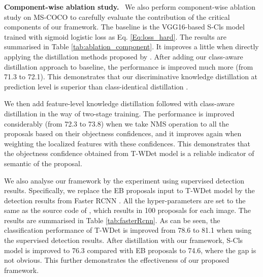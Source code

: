 \documentclass[sigconf,natbib=false]{acmart}
\begin{document}
\noindent \textbf{Component-wise ablation study.} \ We also perform component-wise ablation study on MS-COCO to carefully evaluate the contribution of the critical components of our framework. The baseline is the VGG16-based S-Cls model trained with sigmoid logistic loss as Eq. \ref{Eq:loss_hard}. The results are summarised in Table \ref{tab:ablation_component}. It improves a little when directly applying the distillation methods proposed by \cite{KD1_nips15_goj}. After adding our class-aware distillation approach to baseline, the performance is improved much more (from 71.3 to 72.1). This demonstrates that our discriminative knowledge distillation at prediction level is superior than class-identical distillation \cite{KD1_nips15_goj}.

We then add feature-level knowledge distillation followed with class-aware distillation in the way of two-stage training. The performance is improved considerably (from 72.3 to 73.8) when we take NMS operation to all the proposals based on their objectness confidences, and it improves again when weighting the localized features with these confidences. This demonstrates that the objectness confidence obtained from T-WDet model is a reliable indicator of semantic of the proposal.

We also analyse our framework by the experiment using supervised detection results. Specifically, we replace the EB proposals input to T-WDet model by the detection results from Faster RCNN \cite{Faster-RCNN_nips15_skfj}. All the hyper-parameters are set to the same as the source code of \cite{Faster-RCNN_nips15_skfj}, which results in 100 proposals for each image. The results are summarised in Table \ref{tab:fasterRcnn}. As can be seen, the classification performance of T-WDet is improved from 78.6 to 81.1 when using the supervised detection results. After distillation with our framework, S-Cls model is improved to 76.3 compared with EB proposals to 74.6, where the gap is not obvious. This further demonstrates the effectiveness of our proposed framework.
\end{document}
